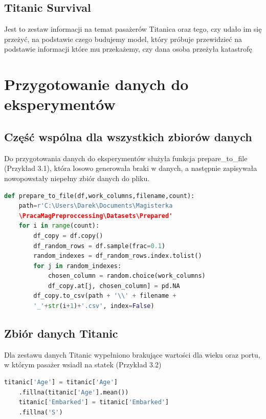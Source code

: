 \documentclass{book}
\begin{document}
\subsection{Titanic Survival}
Jest to zestaw informacji na temat pasażerów Titanica oraz tego, 
czy udało im się przeżyć, na podstawie czego budujemy model, 
który próbuje przewidzieć na podstawie informacji które mu przekażemy, 
czy dana osoba przeżyła katastrofę

\section{Przygotowanie danych do eksperymentów}
\subsection{Część wspólna dla wszystkich zbiorów danych}
Do przygotowania danych do eksperymentów służyła 
funkcja prepare\_to\_file (Przykład 3.1), która losowo generowała braki w danych, a następnie 
zapisywała nowopowstały niepełny zbiór danych do pliku.

\begin{lstlisting}[language=Python, caption={Funkcja generująca braki w podanym zbiorze danych}, captionpos=b]
    def prepare_to_file(df,work_columns,filename,count):
    path=r'C:\Users\Darek\Documents\Magisterka
    \PracaMagPreproccessing\Datasets\Prepared'
    for i in range(count):
        df_copy = df.copy()
        df_random_rows = df.sample(frac=0.1)
        random_indexes = df_random_rows.index.tolist()
        for j in random_indexes:
            chosen_column = random.choice(work_columns)
            df_copy.at[j, chosen_column] = pd.NA
        df_copy.to_csv(path + '\\' + filename +
        '_'+str(i+1)+'.csv', index=False)
\end{lstlisting}

\subsection{Zbiór danych Titanic}
Dla zestawu danych Titanic wypełniono 
brakujące wartości dla wieku oraz portu, w którym pasażer
wsiadł na statek (Przykład 3.2)
 \begin{lstlisting}[language=Python, caption={Przygotowanie zbioru danych Titanic do eksperymentów}, captionpos=b]
    titanic['Age'] = titanic['Age']
    .fillna(titanic['Age'].mean())
    titanic['Embarked'] = titanic['Embarked']
    .fillna('S')
\end{lstlisting}
\end{document}
